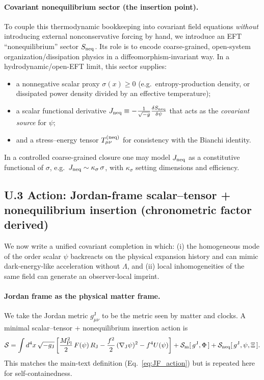 \documentclass[10pt]{article}
\newcommand{\gJ}{g^{\mathrm{J}}}        %
\newcommand{\Mp}{M_{\mathrm{Pl}}}
\newcommand{\Fpsi}{F(\psi)}
\newcommand{\Upsi}{U(\psi)}
\begin{document}
\paragraph{Covariant nonequilibrium sector (the insertion point).}
To couple this thermodynamic bookkeeping into covariant field equations \emph{without} introducing external
nonconservative forcing by hand, we introduce an EFT ``nonequilibrium'' sector $S_{\rm neq}$.
Its role is to encode coarse-grained, open-system organization/dissipation physics in a diffeomorphism-invariant way.
In a hydrodynamic/open-EFT limit, this sector supplies:
\begin{itemize}[leftmargin=1.2em]
\item a nonnegative scalar proxy $\sigma(x)\ge0$ (e.g.\ entropy-production density, or dissipated power density divided by an effective temperature);
\item a scalar functional derivative $J_{\rm neq}\equiv -\frac{1}{\sqrt{-g}}\frac{\delta S_{\rm neq}}{\delta\psi}$
that acts as the \emph{covariant source} for $\psi$;
\item and a stress--energy tensor $T^{(\rm neq)}_{\mu\nu}$ for consistency with the Bianchi identity.
\end{itemize}
In a controlled coarse-grained closure one may model $J_{\rm neq}$ as a constitutive functional of $\sigma$,
e.g.\ $J_{\rm neq}\sim \kappa_\sigma\,\sigma$, with $\kappa_\sigma$ setting dimensions and efficiency.

\subsection{U.3 Action: Jordan-frame scalar--tensor + nonequilibrium insertion (chronometric factor derived)}
\label{app:unified:action}

We now write a unified covariant completion in which:
(i) the homogeneous mode of the order scalar \(\psi\) backreacts on the physical expansion history
and can mimic dark-energy-like acceleration without \(\Lambda\), and
(ii) local inhomogeneities of the same field can generate an observer-local imprint.

\paragraph{Jordan frame as the physical matter frame.}
We take the Jordan metric \(\gJ_{\mu\nu}\) to be the metric seen by matter and clocks. A minimal
scalar--tensor + nonequilibrium insertion action is
\begin{equation}
\mathcal{S}
=
\int d^4x\,\sqrt{-g_{\mathrm{J}}}\left[
\frac{\Mp^{2}}{2}\,\Fpsi\,R_{\mathrm{J}}
-\frac{f^{2}}{2}\,(\nabla_{\mathrm{J}}\psi)^2
-f^{4}\Upsi
\right]
+\mathcal{S}_{\rm m}[\,\gJ,\Phi\,]
+\mathcal{S}_{\rm neq}[\,\gJ,\psi,\Xi\,].
\label{eq:U_action}
\end{equation}
This matches the main-text definition (Eq.~\eqref{eq:JF_action}) but is repeated here for
self-containedness.
\end{document}
